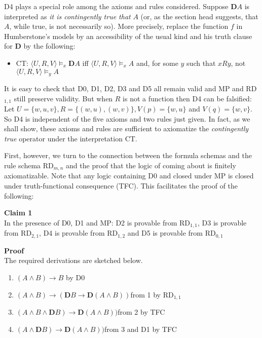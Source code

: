\documentclass[
  11pt,
  letterpaper,
  DIV=11,
  numbers=noendperiod,
  twoside]{scrartcl}
\providecommand{\tightlist}{%
  \setlength{\itemsep}{0pt}\setlength{\parskip}{0pt}}\usepackage{longtable,booktabs,array}
\begin{document}
D4 plays a special role among the axioms and rules considered. Suppose
\(\mathbf{D}{A}\) is interpreted as \emph{it is contingently true that}
\(A\) (or, as the section head suggests, that \(A\), while true, is not
necessarily so). More precisely, replace the function \(f\) in
Humberstone's models by an accessibility of the usual kind and his truth
clause for \(\mathbf{D}\) by the following:

\begin{itemize}
\tightlist
\item
  CT: \(\langle U,R,V\!\rangle \models _x \mathbf{D}A\) iff
  \(\langle U,R,V\!\rangle \models _x A\) and, for some \(y\) such that
  \(xRy\), not \(\langle U,R,V\!\rangle \models _y A\)
\end{itemize}

It is easy to check that D0, D1, D2, D3 and D5 all remain valid and MP
and RD\(_{1,1}\) still preserve validity. But when \(R\) is not a
function then D4 can be falsified: Let
\(U=\{w,u,v\}, R=\{(w,u),(w,v)\}, V(p)=\{w,u\}\) and \(V(q)=\{w,v\}\).
So D4 is independent of the five axioms and two rules just given. In
fact, as we shall show, these axioms and rules are sufficient to
axiomatize the \emph{contingently true} operator under the
interpretation CT.

First, however, we turn to the connection between the formula schemas
and the rule schema RD\(_{m,n}\) and the proof that the logic of coming
about is finitely axiomatizable. Note that any logic containing D0 and
closed under MP is closed under truth-functional consequence (TFC). This
facilitates the proof of the following:

\textbf{Claim 1}\\
In the presence of D0, D1 and MP: D2 is provable from RD\(_{1,1}\), D3
is provable from RD\(_{2,1}\), D4 is provable from RD\(_{1,2}\) and D5
is provable from RD\(_{0,1}\)

\textbf{Proof}\\
The required derivations are sketched below.

\begin{enumerate}
\def\labelenumi{\arabic{enumi}.}
\tightlist
\item
  \((A\wedge B)\rightarrow B\) by D0
\item
  \((A\wedge B)\rightarrow (\mathbf{D}B\rightarrow \mathbf{D}(A\wedge B))\)from
  1 by RD\(_{1,1}\)
\item
  \((A\wedge B\wedge \mathbf{D}B)\rightarrow \mathbf{D}(A\wedge B))\)from
  2 by TFC
\item
  \((A\wedge \mathbf{D}B)\rightarrow \mathbf{D}(A\wedge B))\)from 3 and
  D1 by TFC
\end{enumerate}
\end{document}
